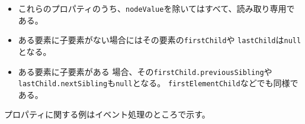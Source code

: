 \iffalse
なお、DOM4\footnote{\texttt{http://www.w3.org/TR/domcore/}}とは2015年11月現在
W3Cが定める次の DOM の規格の Proposed Recommendation(勧告案) である。
DOM の規格は今までに Level 1 から Level 3 までが Recommendation(勧告) と
なっている。
\fi
\begin{itemize}
 \item これらのプロパティのうち、\texttt{nodeValue}を除いてはすべて、読み取り専用である。
 \item ある要素に子要素がない場合にはその要素の\texttt{firstChild}や
\texttt{lastChild}は\texttt{null}となる。
 \item ある要素に子要素がある
場合、その\texttt{firstChild.previousSibling}や
\texttt{lastChild.nextSibling}も\texttt{null}となる。
       \texttt{firstElementChild}などでも同様である。
\end{itemize}

プロパティに関する例はイベント処理のところで示す。


